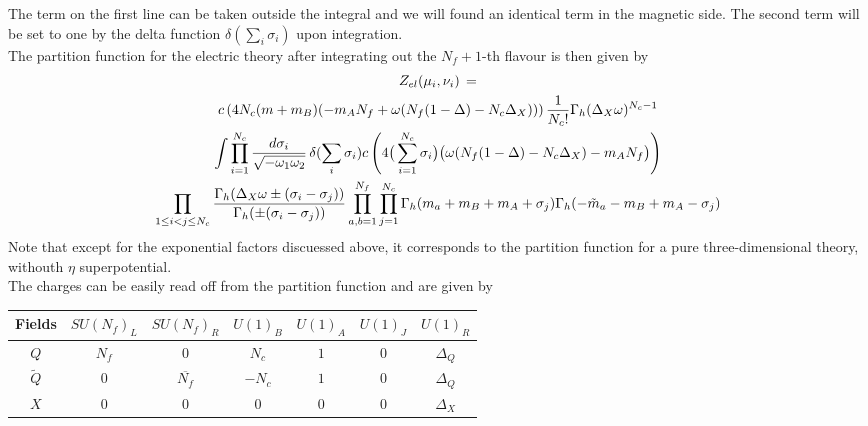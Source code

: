 The term on the first line can be taken outside the integral and we will found an identical term in the magnetic side.
The second term will be set to one by the delta function $\delta(\sum_i \sigma_i)$ upon integration.\\
The partition function for the electric theory after integrating out the $N_f +1$-th flavour is then given by
\begin{multline}
 Z_{el} ( \mu_i , \nu_i )\,  =  \\
 c \left( 4 N_c  ( m  + m_B ) (-  m_A N_f   + \omega ( N_f (1 - \Delta)  - N_c \Delta_X ) ) \right) 
 {1 \over N_c ! }
\Gamma_h ( \Delta_X \omega )^{N_c-1} 
\\ \int
\prod_{i=1}^{N_c} \frac{d \sigma_i}{\sqrt{- \omega_1 \omega_2}} \, \delta( \sum_i \sigma_i)  c \left( 4\big( \sum_{i=1}^{N_c}  \sigma_i  \big) \big( \omega( N_f (1 - \Delta)  - N_c \Delta_X)  -  m_A N_f \big) \right) 
\\
   \prod_{ 1 \leq i<j \leq N_c} \frac{ \Gamma_h( \Delta_X \omega \pm (\sigma_i - \sigma_j)) }{ \Gamma_h ( \pm (\sigma_i - \sigma_j) )}
 \prod_{a,b=1}^{N_f} \prod_{j=1}^{N_c} \Gamma_h ( m_a + m_B + m_A + \sigma_j) \Gamma_h ( -\tilde{m}_a -m_B + m_A - \sigma_j)
\end{multline}
Note that except for the exponential factors discuessed above, it corresponds to the partition function for a pure three-dimensional theory, withouth $\eta$ superpotential.\\
The charges can be easily read off from the partition function and are given by 
\begin{table}[h!]
 \begin{tabular}{|c |c |c |c |c |c |c |}
\hline
Fields & $SU(N_f)_L$ & $SU(N_f)_R$ & $U(1)_B$ & $U(1)_A$ & $U(1)_J$ & $U(1)_R $ \\
\hline
$Q$ & $N_f$ & 0  &$ N_c $& $1 $& 0  & $\Delta_Q$ \\
$\tilde{Q} $  & 0  &$\overline{N_f}$ & $ - N_c $& $1 $ & 0 & $\Delta_Q$ \\
$X$ & 0 & 0 & 0 & 0 &0 & $\Delta_X$ \\
\hline
\end{tabular}
\centering
\end{table}


